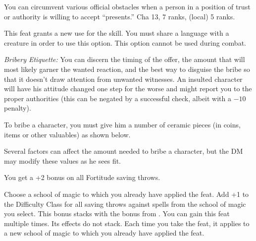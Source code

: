 {You can circumvent various official obstacles when a person in a position of trust or authority is willing to accept ``presents.''}
{Cha 13,  7 ranks,  (local) 5 ranks.}
{This feat grants a new use for the  skill. You must share a language with a creature in order to use this option. This option cannot be used during combat.

\textit{Bribery Etiquette:} You can discern the timing of the offer, the amount that will most likely garner the wanted reaction, and the best way to disguise the bribe so that it doesn't draw attention from unwanted witnesses. An insulted character will have his attitude changed one step for the worse and might report you to the proper authorities (this can be negated by a successful  check, albeit with a $-10$ penalty).

To bribe a character, you must give him a number of ceramic pieces (in coins, items or other valuables) as
shown below.


Several factors can affect the amount needed to bribe a character, but the DM may modify these values as he sees fit.

}{}{}

{You get a +2 bonus on all Fortitude saving throws.}

{Choose a school of magic to which you already have applied the  feat.}{}
{Add +1 to the Difficulty Class for all saving throws against spells from the school of magic you select. This bonus stacks with the bonus from .}{}
{You can gain this feat multiple times. Its effects do not stack. Each time you take the feat, it applies to a new school of magic to which you already have applied the  feat.}{}

